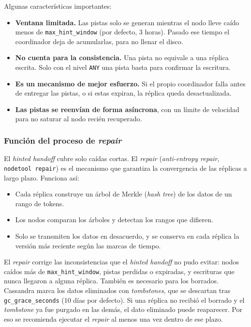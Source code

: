 \documentclass[11pt,a4paper]{article}
\begin{document}
Algunas características importantes:
\begin{itemize}[nosep]
  \item \textbf{Ventana limitada.} Las pistas solo se generan mientras el nodo lleve caído menos de \texttt{max\_hint\_window} (por defecto, 3 horas). Pasado ese tiempo el coordinador deja de acumularlas, para no llenar el disco.
  \item \textbf{No cuenta para la consistencia.} Una pista no equivale a una réplica escrita. Solo con el nivel \texttt{ANY} una pista basta para confirmar la escritura.
  \item \textbf{Es un mecanismo de mejor esfuerzo.} Si el propio coordinador falla antes de entregar las pistas, o si estas expiran, la réplica queda desactualizada.
  \item \textbf{Las pistas se reenvían de forma asíncrona}, con un límite de velocidad para no saturar al nodo recién recuperado.
\end{itemize}

\subsubsection{Función del proceso de \textit{repair}}

El \textit{hinted handoff} cubre solo caídas cortas. El \textit{repair} (\textit{anti-entropy repair}, \texttt{nodetool repair}) es el mecanismo que garantiza la convergencia de las réplicas a largo plazo. Funciona así:
\begin{itemize}[nosep]
  \item Cada réplica construye un árbol de Merkle (\textit{hash tree}) de los datos de un rango de tokens.
  \item Los nodos comparan los árboles y detectan los rangos que difieren.
  \item Solo se transmiten los datos en desacuerdo, y se conserva en cada réplica la versión más reciente según las marcas de tiempo.
\end{itemize}

El \textit{repair} corrige las inconsistencias que el \textit{hinted handoff} no pudo evitar: nodos caídos más de \texttt{max\_hint\_window}, pistas perdidas o expiradas, y escrituras que nunca llegaron a alguna réplica. También es necesario para los borrados. Cassandra marca los datos eliminados con \textit{tombstones}, que se descartan tras \texttt{gc\_grace\_seconds} (10 días por defecto). Si una réplica no recibió el borrado y el \textit{tombstone} ya fue purgado en las demás, el dato eliminado puede reaparecer. Por eso se recomienda ejecutar el \textit{repair} al menos una vez dentro de ese plazo.
\end{document}
